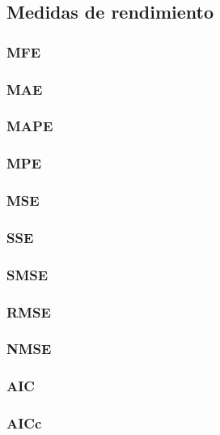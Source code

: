 \documentclass[
]{article}
\begin{document}
\subsection{Medidas de rendimiento}

\subsubsection{MFE}

\subsubsection{MAE}

\subsubsection{MAPE}

\subsubsection{MPE}

\subsubsection{MSE}

\subsubsection{SSE}

\subsubsection{SMSE}

\subsubsection{RMSE}

\subsubsection{NMSE}

\subsubsection{AIC}

\subsubsection{AICc}
\end{document}
